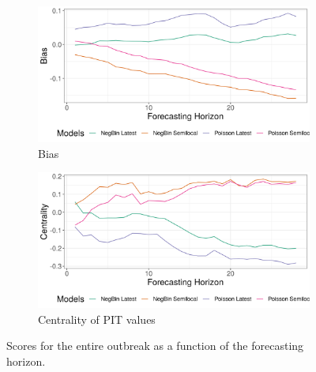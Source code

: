 \begin{figure}[H]
\begin{subfigure}{0.5\textwidth}
  \centering
  \includegraphics[width=\linewidth]{../output/national_bias.png}  
  \caption{Bias}
  \label{fig:sub-third}
\end{subfigure}
\begin{subfigure}{0.5\textwidth}
  \centering
  \includegraphics[width=\linewidth]{../output/national_centrality.png}  
  \caption{Centrality of PIT values}
  \label{fig:nat_scores_4}
\end{subfigure}
  \caption{Scores for the entire outbreak as a function of the forecasting horizon.}

  \label{fig:nat_scores}
\end{figure}
